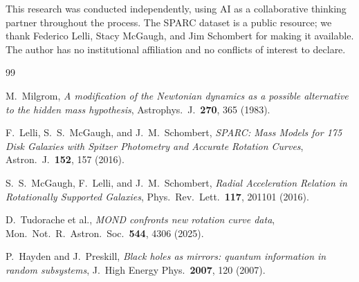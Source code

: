 \documentclass[aps,prl,twocolumn,superscriptaddress,nofootinbib]{revtex4-2}
\begin{document}
\begin{acknowledgments}
This research was conducted independently, using AI as a collaborative thinking partner throughout the process. The SPARC dataset is a public resource; we thank Federico Lelli, Stacy McGaugh, and Jim Schombert for making it available. The author has no institutional affiliation and no conflicts of interest to declare.
\end{acknowledgments}

\begin{thebibliography}{99}

M.~Milgrom,
\textit{A modification of the Newtonian dynamics as a possible alternative to the hidden mass hypothesis},
Astrophys.\ J.\ \textbf{270}, 365 (1983).

F.~Lelli, S.~S.~McGaugh, and J.~M.~Schombert,
\textit{SPARC: Mass Models for 175 Disk Galaxies with Spitzer Photometry and Accurate Rotation Curves},
Astron.\ J.\ \textbf{152}, 157 (2016).

S.~S.~McGaugh, F.~Lelli, and J.~M.~Schombert,
\textit{Radial Acceleration Relation in Rotationally Supported Galaxies},
Phys.\ Rev.\ Lett.\ \textbf{117}, 201101 (2016).

D.~Tudorache et al.,
\textit{MOND confronts new rotation curve data},
Mon.\ Not.\ R.\ Astron.\ Soc.\ \textbf{544}, 4306 (2025).

P.~Hayden and J.~Preskill,
\textit{Black holes as mirrors: quantum information in random subsystems},
J.\ High Energy Phys.\ \textbf{2007}, 120 (2007).

\end{thebibliography}
\end{document}
